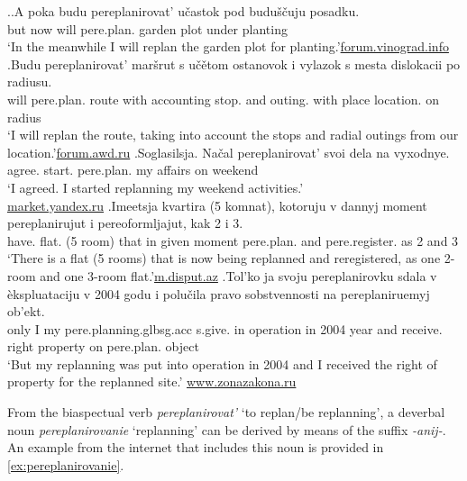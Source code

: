 \ex.\label{ex:pereplanirovat:imperf}\ag.\label{ex:pereplanirovat:future1}A poka budu pereplanirovat'\textsuperscript{\IPF} u\v{c}astok pod budu\v{s}\v{c}uju posadku.\\
but now will pere.plan. {garden plot} under  planting\\
\trans `In the meanwhile I will replan the garden plot for  planting.'\hbox{}\hfill\hbox{\url{forum.vinograd.info}}
\bg.\label{ex:pereplanirovat:future2}Budu pereplanirovat' mar\v{s}rut s u\v{c}\v{e}tom ostanovok i vylazok s mesta dislokacii po radiusu.\\
will pere.plan. route with accounting stop. and outing. with place location. on radius\\
\trans `I will replan the route, taking into account the stops and radial outings from our location.'\hbox{}\hfill\hbox{\url{forum.awd.ru}}
\bg.\label{ex:pereplanirovat:start}Soglasilsja. Na\v{c}al pereplanirovat' svoi dela na vyxodnye.\\
agree. start. pere.plan. my affairs on weekend\\
\trans `I agreed. I started replanning my weekend activities.'\\\hbox{}\hfill\hbox{\url{market.yandex.ru}}
\bg.\label{ex:pereplanirovat:prog}Imeetsja kvartira (5 komnat), kotoruju v dannyj moment pereplanirujut i pereoformljajut, kak 2 i 3.\\
have. flat. (5 room) that in given moment pere.plan. and pere.register. as 2 and 3\\
\trans `There is a flat (5 rooms) that is now being replanned and reregistered, as one 2-room and one 3-room flat.'\hbox{}\hfill\hbox{\url{m.disput.az}}
\bg.\label{ex:pereplanirovat:part}Tol'ko ja svoju pereplanirovku sdala v \`{e}kspluataciju v 2004 godu i polu\v{c}ila pravo sobstvennosti na pereplaniruemyj ob'ekt.\\
only I my pere.planning.glb{sg.acc} s.give. in operation in 2004 year and receive. right property on pere.plan. object\\
`But my replanning was put into operation in 2004 and I received the right of property for the replanned site.'
\hbox{}\hfill\hbox{\url{www.zonazakona.ru}}

From the biaspectual verb \textit{pereplanirovat'} `to replan/be replanning', a deverbal noun \textit{pereplanirovanie} `replanning' can be derived by means of the suffix \textit{-anij-}. An example from the internet that includes this noun is provided in \ref{ex:pereplanirovanie}.

